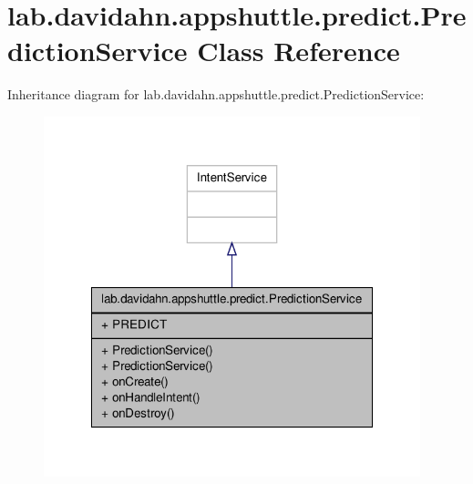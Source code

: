 \hypertarget{classlab_1_1davidahn_1_1appshuttle_1_1predict_1_1_prediction_service}{\section{lab.\-davidahn.\-appshuttle.\-predict.\-Prediction\-Service \-Class \-Reference}
\label{classlab_1_1davidahn_1_1appshuttle_1_1predict_1_1_prediction_service}
}


\-Inheritance diagram for lab.\-davidahn.\-appshuttle.\-predict.\-Prediction\-Service\-:
\nopagebreak
\begin{figure}[H]
\begin{center}
\leavevmode
\includegraphics[width=310pt]{classlab_1_1davidahn_1_1appshuttle_1_1predict_1_1_prediction_service__inherit__graph}
\end{center}
\end{figure}


